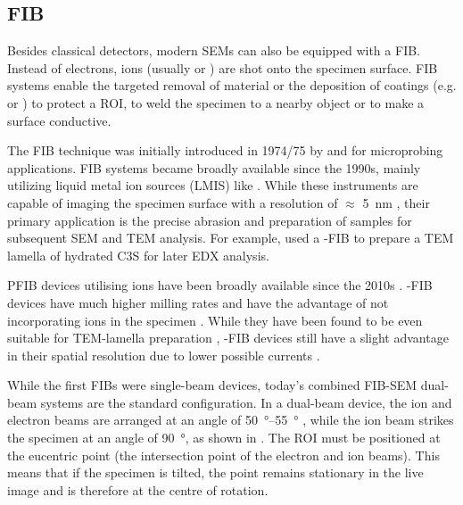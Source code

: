 
\FloatBarrier
\subsection[Focussed ion beam]{\Acl*{FIB}}
\label{sec:lit_fib}

Besides classical detectors, modern \ac{SEM}s can also be equipped with a \ac{FIB}.
Instead of electrons, ions (usually  or ) are shot onto the specimen surface.
\ac{FIB} systems enable the targeted removal of material or the deposition of coatings (e.g.  or ) to protect a \ac{ROI}, to weld the specimen to a nearby object or to make a surface conductive.

The \ac{FIB} technique was initially introduced in 1974/75 by \textcite{levi-setti.1974} and \textcite{orloff.1975} for microprobing applications.
\Ac{FIB} systems became broadly available since the 1990s, mainly utilizing liquid metal ion sources (LMIS) like  \cite{volkert.2007}.
While these instruments are capable of imaging the specimen surface with a resolution of $\approx$ \qty{5}{\nano\meter} \cite{orloff.1996}, their primary application is the precise abrasion and preparation of samples for subsequent \ac{SEM} and \ac{TEM} analysis.
For example, \textcite{sakalli.2017} used a -\ac{FIB} to prepare a \ac{TEM} lamella of hydrated \ac{C3S} for later \ac{EDX} analysis.

\ac{PFIB} devices utilising  ions have been broadly available since the 2010s \cite{hrncir.2012}.
-\ac{FIB} devices have much higher milling rates and have the advantage of not incorporating  ions in the specimen \cite{burnett.2016}.
While they have been found to be even suitable for \ac{TEM}-lamella preparation \cite{zhong.2021}, -\ac{FIB} devices still have a slight advantage in their spatial resolution due to lower possible currents \cite{zhong.2021}.

While the first \ac{FIB}s were single-beam devices, today's combined \ac{FIB}-\ac{SEM} dual-beam systems are the standard configuration.
In a dual-beam device, the ion and electron beams are arranged at an angle of \qtyrange{50}{55}{\degree} \cite{taillon.2018}, while the ion beam strikes the specimen at an angle of \qty{90}{\degree}, as shown in .
The \ac{ROI} must be positioned at the eucentric point (the intersection point of the electron and ion beams).
This means that if the specimen is tilted, the point remains stationary in the live image and is therefore at the centre of rotation.

